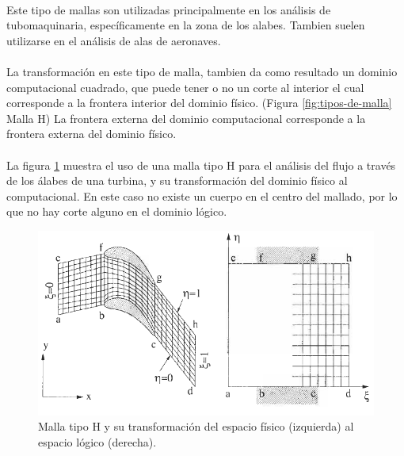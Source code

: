 \documentclass[letterpaper, openright, 12pt]{book}
\begin{document}
			\paragraph*{}
				Este tipo de mallas son utilizadas principalmente en los análisis de tubomaquinaria, específicamente en la zona de los alabes.\cite{blazek}\cite{best-practices-grid-generation} Tambien suelen utilizarse en el análisis de alas de aeronaves. \cite{vladimir-grid}
			\paragraph*{}
				La transformación en este tipo de malla, tambien da como resultado un dominio computacional cuadrado, que puede tener o no un corte al interior el cual corresponde a la frontera interior del dominio físico. (Figura \ref*{fig:tipos-de-malla} Malla H) La frontera externa del dominio computacional corresponde a la frontera externa del dominio físico.
			
			\paragraph*{} 
			La figura \ref{fig:malla-h} muestra el uso de una malla tipo H para el análisis del flujo a través de los álabes de una turbina, y su transformación del dominio físico al computacional. En este caso no existe un cuerpo en el centro del mallado, por lo que no hay corte alguno en el dominio lógico.
			\begin{figure}[htbp!]
				\centering
				\includegraphics[width=170mm]{./Imagenes/malla-h}
				\captionsetup{justification=centering, margin=2cm}
				\caption[Malla tipo O]{Malla tipo H y su transformación del espacio físico (izquierda) al espacio lógico (derecha). \cite{blazek}}
				\label{fig:malla-h}
			\end{figure}
\end{document}
